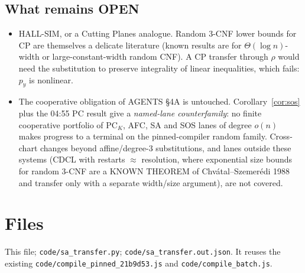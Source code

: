 \documentclass[11pt]{article}
\theoremstyle{definition}
\begin{document}
\subsection*{What remains OPEN}
\begin{itemize}
\item HALL-SIM, or a Cutting Planes analogue. Random 3-CNF lower bounds for CP are themselves a delicate literature (known results are for $\Theta(\log n)$-width or large-constant-width random CNF). A CP transfer through $\rho$ would need the substitution to preserve integrality of linear inequalities, which fails: $p_y$ is nonlinear.
\item The cooperative obligation of AGENTS \S4A is untouched. Corollary~\ref{cor:sos} plus the 04:55 PC result give a \emph{named-lane counterfamily}: no finite cooperative portfolio of PC$_K$, AFC, SA and SOS lanes of degree $o(n)$ makes progress to a terminal on the pinned-compiler random family. Cross-chart changes beyond affine/degree-3 substitutions, and lanes outside these systems (CDCL with restarts $\approx$ resolution, where exponential size bounds for random 3-CNF are a KNOWN THEOREM of Chv\'atal--Szemer\'edi 1988 and transfer only with a separate width/size argument), are not covered.
\end{itemize}

\section*{Files}
This file; \texttt{code/sa\_transfer.py}; \texttt{code/sa\_transfer.out.json}. It reuses the existing \texttt{code/compile\_pinned\_21b9d53.js} and \texttt{code/compile\_batch.js}.
\end{document}
